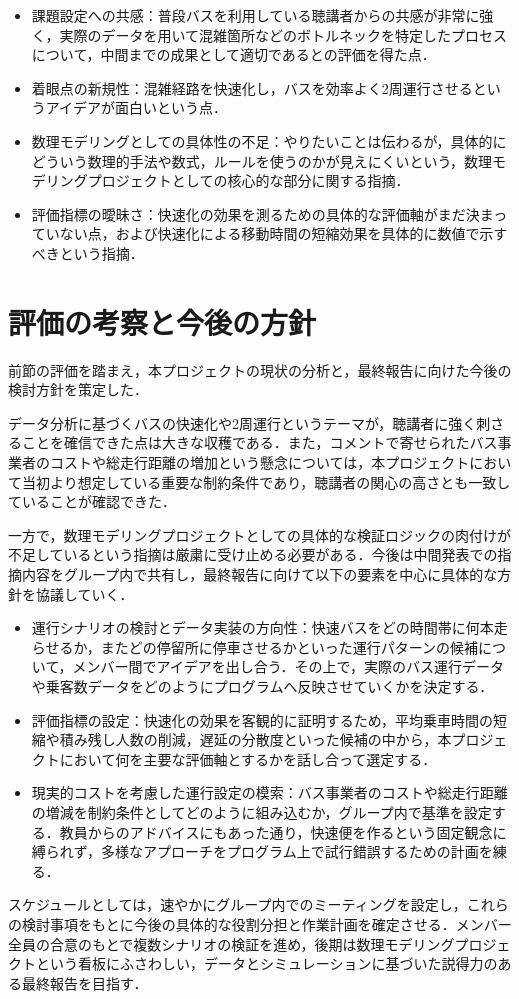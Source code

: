 \begin{itemize}
  \item 課題設定への共感：普段バスを利用している聴講者からの共感が非常に強く，実際のデータを用いて混雑箇所などのボトルネックを特定したプロセスについて，中間までの成果として適切であるとの評価を得た点．
  \item 着眼点の新規性：混雑経路を快速化し，バスを効率よく2周運行させるというアイデアが面白いという点．
  \item 数理モデリングとしての具体性の不足：やりたいことは伝わるが，具体的にどういう数理的手法や数式，ルールを使うのかが見えにくいという，数理モデリングプロジェクトとしての核心的な部分に関する指摘．
  \item 評価指標の曖昧さ：快速化の効果を測るための具体的な評価軸がまだ決まっていない点，および快速化による移動時間の短縮効果を具体的に数値で示すべきという指摘．
\end{itemize}

\section{評価の考察と今後の方針}
前節の評価を踏まえ，本プロジェクトの現状の分析と，最終報告に向けた今後の検討方針を策定した．

データ分析に基づくバスの快速化や2周運行というテーマが，聴講者に強く刺さることを確信できた点は大きな収穫である．また，コメントで寄せられたバス事業者のコストや総走行距離の増加という懸念については，本プロジェクトにおいて当初より想定している重要な制約条件であり，聴講者の関心の高さとも一致していることが確認できた．

一方で，数理モデリングプロジェクトとしての具体的な検証ロジックの肉付けが不足しているという指摘は厳粛に受け止める必要がある．今後は中間発表での指摘内容をグループ内で共有し，最終報告に向けて以下の要素を中心に具体的な方針を協議していく．

\begin{itemize}
  \item 運行シナリオの検討とデータ実装の方向性：快速バスをどの時間帯に何本走らせるか，またどの停留所に停車させるかといった運行パターンの候補について，メンバー間でアイデアを出し合う．その上で，実際のバス運行データや乗客数データをどのようにプログラムへ反映させていくかを決定する．
  \item 評価指標の設定：快速化の効果を客観的に証明するため，平均乗車時間の短縮や積み残し人数の削減，遅延の分散度といった候補の中から，本プロジェクトにおいて何を主要な評価軸とするかを話し合って選定する．
  \item 現実的コストを考慮した運行設定の模索：バス事業者のコストや総走行距離の増減を制約条件としてどのように組み込むか，グループ内で基準を設定する．教員からのアドバイスにもあった通り，快速便を作るという固定観念に縛られず，多様なアプローチをプログラム上で試行錯誤するための計画を練る．
\end{itemize}

スケジュールとしては，速やかにグループ内でのミーティングを設定し，これらの検討事項をもとに今後の具体的な役割分担と作業計画を確定させる．メンバー全員の合意のもとで複数シナリオの検証を進め，後期は数理モデリングプロジェクトという看板にふさわしい，データとシミュレーションに基づいた説得力のある最終報告を目指す．
